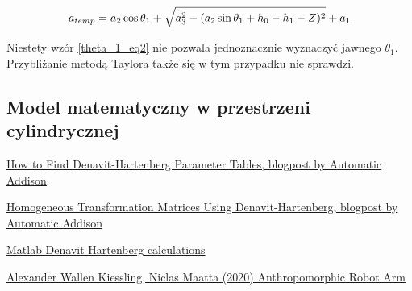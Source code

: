 \documentclass[a4paper,13pt]{article}
\begin{document}
\begin{equation} \label{theta_1_eq2}
a_{temp} = a_2 \cos{\theta_1} + \sqrt{a_3^2 - (a_2 \sin{\theta_1 + h_0 - h_1 - Z})^2} + a_1\\
\end{equation}

Niestety wzór \ref{theta_1_eq2} nie pozwala jednoznacznie wyznaczyć jawnego $\theta_1$. Przybliżanie metodą Taylora także się w tym przypadku nie sprawdzi. 

\subsection{Model matematyczny w przestrzeni cylindrycznej}

\begin{thebibliography}{9}
\href{https://automaticaddison.com/how-to-find-denavit-hartenberg-parameter-tables/}{How to Find Denavit-Hartenberg Parameter Tables, blogpost by Automatic Addison}

\href{https://automaticaddison.com/homogeneous-transformation-matrices-using-denavit-hartenberg/}{Homogeneous Transformation Matrices Using Denavit-Hartenberg, blogpost by Automatic Addison}

\href{./DH_calculations.m}{Matlab Denavit Hartenberg calculations}

\bibitem{}
\href{https://www.diva-portal.org/smash/get/diva2:1462059/FULLTEXT01.pdf}{Alexander Wallen Kiessling, Niclas Maatta (2020) Anthropomorphic Robot Arm}

\end{thebibliography}
\end{document}
